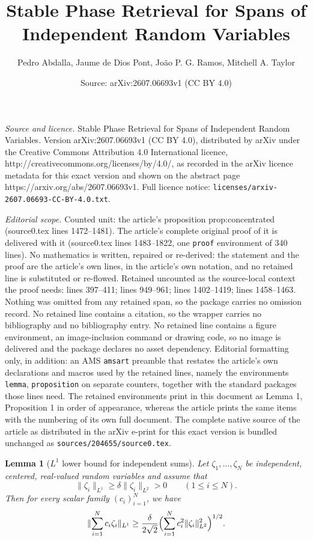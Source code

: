 \documentclass[10pt,a4paper]{amsart}
\title{Stable Phase Retrieval for Spans of Independent Random Variables}
\author{Pedro Abdalla, Jaume de Dios Pont, Jo\~ao P. G. Ramos, Mitchell A. Taylor}
\date{Source: arXiv:2607.06693v1 (CC BY 4.0)}
\newtheorem{lemma}{Lemma}
\newcommand{\norm}[1]{\lVert #1 \rVert}
\begin{document}
\maketitle

\noindent\emph{Source and licence.} Stable Phase Retrieval for Spans of Independent Random Variables. Version arXiv:2607.06693v1 (CC BY 4.0), distributed by arXiv under the Creative Commons Attribution 4.0 International licence, http://creativecommons.org/licenses/by/4.0/, as recorded in the arXiv licence metadata for this exact version and shown on the abstract page https://arxiv.org/abs/2607.06693v1. Full licence notice: \texttt{licenses/arxiv-2607.06693-CC-BY-4.0.txt}.\par\smallskip

\noindent\textit{Editorial scope.} Counted unit: the article's proposition prop:concentrated (source0.tex lines 1472--1481). The article's complete original proof of it is delivered with it (source0.tex lines 1483--1822, one \texttt{proof} environment of 340 lines). No mathematics is written, repaired or re-derived: the statement and the proof are the article's own lines, in the article's own notation, and no retained line is substituted or re-flowed.  Retained uncounted as the source-local context the proof needs: lines 397--411; lines 949--961; lines 1402--1419; lines 1458--1463.  Nothing was omitted from any retained span, so the package carries no omission record.  No retained line contains a citation, so the wrapper carries no bibliography and no bibliography entry.  No retained line contains a figure environment, an image-inclusion command or drawing code, so no image is delivered and the package declares no asset dependency.  Editorial formatting only, in addition: an AMS \texttt{amsart} preamble that restates the article's own declarations and macros used by the retained lines, namely the environments \texttt{lemma}, \texttt{proposition} on separate counters, together with the standard packages those lines need.  The retained environments print in this document as Lemma 1, Proposition 1 in order of appearance, whereas the article prints the same items with the numbering of its own full document.  The complete native source of the article as distributed in the arXiv e-print for this exact version is bundled unchanged as \texttt{sources/204655/source0.tex}.
\begin{lemma}[$L^1$ lower bound for independent sums]\label{lem:l1lower}
Let $\zeta_1,\dots,\zeta_N$ be independent, centered, real-valued random variables and
assume that
\[
\norm{\zeta_i}_{L^1}\ge \delta \norm{\zeta_i}_{L^2}>0
\qquad(1\le i\le N).
\]
Then for every scalar family $(c_i)_{i=1}^N$, we have
\[
\norm{\sum_{i=1}^N c_i\zeta_i}_{L^1}
\ge
\frac{\delta}{2\sqrt2}
\Bigl(\sum_{i=1}^N c_i^2\norm{\zeta_i}_{L^2}^2\Bigr)^{1/2}.
\]
\end{lemma}
\end{document}
